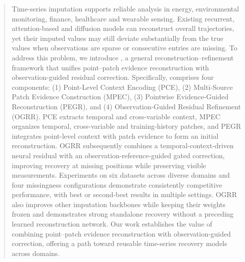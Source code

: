 \begin{abstract}
Time-series imputation supports reliable analysis in energy, environmental monitoring, finance, healthcare and wearable sensing. Existing recurrent, attention-based and diffusion models can reconstruct overall trajectories, yet their imputed values may still deviate substantially from the true values when observations are sparse or consecutive entries are missing. To address this problem, we introduce \Model, a general reconstruction--refinement framework that unifies point--patch evidence reconstruction with observation-guided residual correction. Specifically, \Model{} comprises four components: (1) Point-Level Context Encoding (PCE), (2) Multi-Source Patch Evidence Construction (MPEC), (3) Pointwise Evidence-Guided Reconstruction (PEGR), and (4) Observation-Guided Residual Refinement (OGRR). PCE extracts temporal and cross-variable context, MPEC organizes temporal, cross-variable and training-history patches, and PEGR integrates point-level context with patch evidence to form an initial reconstruction. OGRR subsequently combines a temporal-context-driven neural residual with an observation-reference-guided gated correction, improving recovery at missing positions while preserving visible measurements. Experiments on six datasets across diverse domains and four missingness configurations demonstrate consistently competitive performance, with best or second-best results in multiple settings. OGRR also improves other imputation backbones while keeping their weights frozen and demonstrates strong standalone recovery without a preceding learned reconstruction network. Our work establishes the value of combining point--patch evidence reconstruction with observation-guided correction, offering a path toward reusable time-series recovery models across domains.
\end{abstract}
